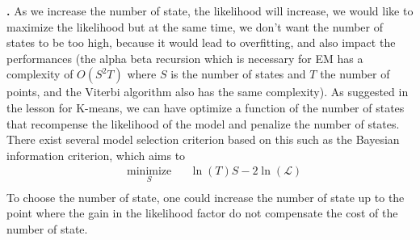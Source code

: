 \documentclass[a4paper, 11pt]{article}
\newcounter{cquestion}[subsection]
\renewcommand{\thecquestion}{\arabic{cquestion}}
\newenvironment{question}
{\par \vspace{0.5em} \noindent \stepcounter{cquestion} \hspace{-1em}
  \textbf{\thecquestion.}}
{}
\begin{document}
\begin{question}
  As we increase the number of state, the likelihood will increase, we
  would like to maximize the likelihood but at the same time, we don't
  want the number of states to be too high, because it would lead to
  overfitting, and also impact the performances (the alpha beta
  recursion which is necessary for EM has a complexity of $O(S^2 T)$
  where $S$ is the number of states and $T$ the number of points, and
  the Viterbi algorithm also has the same complexity). As suggested in
  the lesson for K-means, we can have optimize a function of the
  number of states that recompense the likelihood of the model and
  penalize the number of states. There exist several model selection
  criterion based on this such as the Bayesian information criterion,
  which aims to
  \begin{equation*}
    \begin{aligned}
      & \underset{S}{\text{minimize}}
      & & \ln(T) S - 2 \ln(\mathcal{L}) \\
    \end{aligned}
  \end{equation*}
  To choose the number of state, one could increase the number of
  state up to the point where the gain in the likelihood factor do not
  compensate the cost of the number of state.

\end{question}
\end{document}
